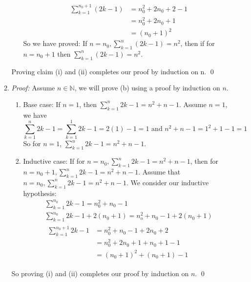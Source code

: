 \documentclass{article}
\begin{document}
\begin{enumerate}
\begin{enumerate}
\begin{enumerate}
                        \begin{equation*}
                            \begin{split}
                            \sum_{k=1}^{n_{0}+1} (2k - 1)& =  n_{0}^2 + 2n_{0} + 2 - 1\\
                                &= n_{0}^2 + 2n_{0} + 1\\
                                &= (n_{0} + 1)^2
                            \end{split}
                        \end{equation*}
                    So we have proved: If $n = n_{0}, \sum_{k=1}^n (2k - 1) = n^2$, then if for $n = n_{0} + 1$ then $\sum_{k=1}^n (2k - 1) = n^2.$
                \end{enumerate}
            Proving claim (i) and (ii) completes our proof by induction on n. \qed

        \item \emph{Proof:} Assume $n \in \mathbb{N}$, we will prove (b) 
                using a proof by induction on $n$.

                \begin{enumerate}
                    \item Base case: If $n = 1$, then $\sum_{k=1}^n 2k - 1 = n^2 + n - 1.$
                        Assume $n = 1$, we have
                        \begin{equation*}
                            \sum_{k=1}^n 2k - 1 = \sum_{k=1}^1 2k - 1 = 2 (1) - 1 = 1 \text{ and }
                            n^2 + n - 1 = 1^2 + 1 - 1 = 1
                        \end{equation*}
                        So for $n = 1$, $\sum_{k=1}^n 2k - 1 = n^2 + n - 1$.
                    \item Inductive case: If for $n = n_0, \sum_{k=1}^n 2k - 1 = n^2 +n - 1$, then for $n = n_0 + 1, \sum_{k=1}^n 2k - 1 = n^2 + n - 1.$
                        Assume that $n = n_0, \sum_{k=1}^n 2k - 1 = n^2 + n - 1$.
                        We consider our inductive hypothesis:
                            \begin{gather*}
                            \sum_{k=1}^{n_0} 2k - 1 = n_0^2 + n_0 - 1\\
                            \sum_{k=1}^{n_0} 2k - 1 + 2(n_0 + 1) = n_o^2 + n_0 - 1 + 2(n_0 + 1)\\
                            \begin{split}
                                \sum_{k=1}^{n_0 + 1} 2k - 1& = n_0^2 + n_0 - 1 + 2n_0 + 2\\
                                &= n_0^2 + 2n_0 + 1 + n_0 + 1 - 1\\
                                &= (n_0 + 1)^2 + (n_0 + 1) - 1
                            \end{split}
                            \end{gather*}
                \end{enumerate}
                So proving (i) and (ii) completes our proof by induction on $n$. \qed
        \end{enumerate}
        

\end{enumerate}
\end{document}
